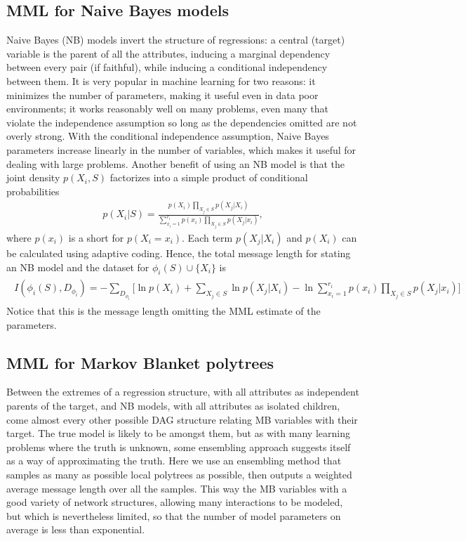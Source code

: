 \documentclass{svmult}
\begin{document}
\subsection{MML for Naive Bayes models}

Naive Bayes (NB) models invert the structure of regressions: a central
(target) variable is the parent of all the attributes, inducing a
marginal dependency between every pair (if faithful), while inducing a
conditional independency between them. It is very popular in machine
learning for two reasons: it minimizes the number of parameters,
making it useful even in data poor environments; it works reasonably
well on many problems, even many that violate the independence
assumption so long as the dependencies omitted are not overly strong.
With the conditional independence assumption,
Naive Bayes parameters increase linearly in the number of variables,
which makes it useful for dealing with large problems. Another benefit
of using an NB model is that the joint density $p(X_i, S)$ factorizes into
a simple product of conditional probabilities
\begin{align}
p(X_i|S) = \frac{p(X_i)\prod_{X_j \in S} p(X_j|X_i)}{\sum_{x_i=1}^{r_i} p(x_i)\prod_{X_j \in S} p(X_j|x_i)},
\end{align}
where $p(x_i)$ is a short for $p(X_i = x_i)$. Each term $p(X_j | X_i)$
and $p(X_i)$ can be calculated using adaptive coding. Hence, the total
message length for stating an NB model and the dataset for
$\phi_i(S) \cup \{ X_i \}$ is
\begin{align}
\label{eq:mmlnb}
\begin{split}
I(\phi_i(S), D_{\phi_i}) = -\sum_{D_{\phi_i}} \biggl[
\ln p(X_i) + \sum_{X_j \in S} \ln p(X_j|X_i) 
-\ln \sum_{x_i=1}^{r_i} p(x_i)\prod_{X_j \in S} p(X_j|x_i)
\biggr]	
\end{split}
\end{align}
Notice that this is the message length omitting the MML
estimate of the parameters. 

\subsection{MML for Markov Blanket polytrees}

Between the extremes of a regression structure, with all attributes as
independent parents of the target, and NB models, with all attributes
as isolated children, come almost every other possible DAG structure
relating MB variables with their target. The true model is likely to
be amongst them, but as with many learning problems where the truth is
unknown, some ensembling approach suggests itself as a way of
approximating the truth. Here we use an ensembling method that samples
as many as possible local polytrees as possible, then outputs a
weighted average message length over all the samples.  This way the MB
variables with a good variety of network structures, allowing many
interactions to be modeled, but which is nevertheless limited, so that
the number of model parameters on average is less than exponential.
\end{document}
